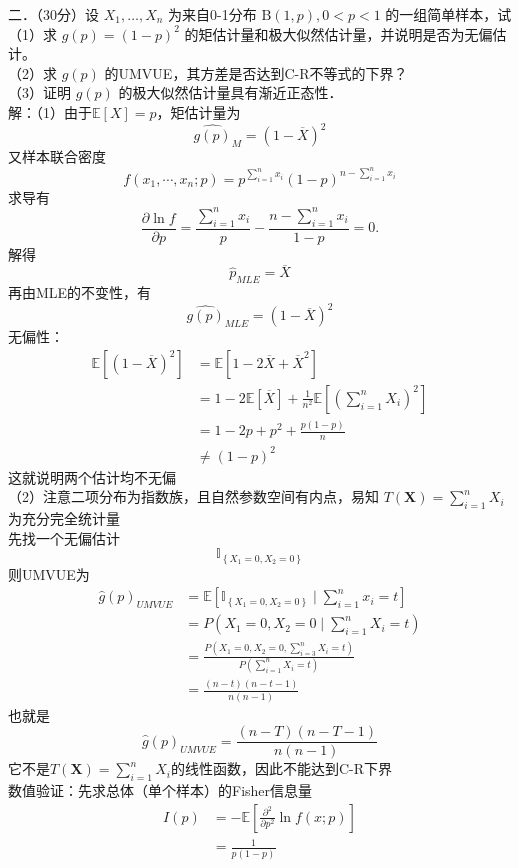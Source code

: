 \documentclass[UTF8]{ctexart}
\begin{document}
\noindent 二．（30分）设 $X_1, \ldots, X_n$ 为来自0-1分布 $\mathrm{B}(1, p), 0<p<1$ 的一组简单样本，试\\
（1）求 $g(p)=(1-p)^2$ 的矩估计量和极大似然估计量，并说明是否为无偏估计。\\
（2）求 $g(p)$ 的UMVUE，其方差是否达到C-R不等式的下界？\\
（3）证明 $g(p)$ 的极大似然估计量具有渐近正态性．\\
解：（1）由于$\mathbb{E}[X]=p$，矩估计量为
\[
\hat{g({p})}_M=(1-\overline{X})^2
\]
又样本联合密度
\[
f\left(x_1, \cdots, x_n ; p\right)=p^{\sum_{i=1}^n x_i}(1-p)^{n-\sum_{i=1}^n x_i}
\]
求导有
\[
\frac{\partial \ln f}{\partial p}=\frac{\sum_{i=1}^{n} x_i}{p}-\frac{n-\sum_{i=1}^n x_i}{1-p}=0 .
\]
解得
\[
\hat{p}_{MLE}=\overline{X}
\]
再由MLE的不变性，有
\[
\hat{g(p)}_{MLE}=\left(1-\overline{X} \right)^2 
\]
无偏性：
\[
\begin{aligned}
	\mathbb{E}\left[(1-\overline{X})^2\right] & =\mathbb{E}\left[1-2 \overline{X}+\overline{X}^2\right] \\
	& =1-2 \mathbb{E}[\overline{X}]+\frac{1}{n^2} \mathbb{E}\left[\left(\sum_{i=1}^n X_i\right)^2 \right] \\
	& =1-2 p+p^2+\frac{p(1-p)}{n} \\
	& \neq(1-p)^2
\end{aligned}
\]
这就说明两个估计均不无偏\\
（2）注意二项分布为指数族，且自然参数空间有内点，易知 $T(\boldsymbol{X})=\sum\limits_{i=1}^n X_i$ 为充分完全统计量\\
先找一个无偏估计
\[
\mathbb{I}_{\left\{X_1=0, X_2=0\right\}}
\]
则UMVUE为
\[
\begin{aligned}
	\hat{g}(p)_{UMVUE} &=\mathbb{E}\left[\mathbb{I}_{\left\{X_1=0, X_2=0\right\}} \mid \sum_{i=1}^n x_i=t\right] \\
	& =P\left(X_1=0, X_2=0 \mid \sum_{i=1}^n X_i=t \right) \\
	& =\frac{P\left(X_1=0, X_2=0, \sum_{i=3}^n X_i=t\right)}{P\left(\sum_{i=1}^n X_i=t\right)}\\
	&=\frac{(n-t)(n-t-1)}{n(n-1) }
\end{aligned}
\]
也就是
\[
\hat{g}(p)_{UMVUE}=\frac{(n-T)(n-T-1)}{n(n-1) }
\]
它不是$T(\boldsymbol{X})=\sum\limits_{i=1}^n X_i$的线性函数，因此不能达到C-R下界\\
数值验证：先求总体（单个样本）的Fisher信息量
\[
\begin{aligned}
	I\left(p\right) & =-\mathbb{E}\left[\frac{\partial^2}{\partial p^2} \ln f\left(x ; p\right)\right] \\
	& =\frac{1}{p(1-p)} 
\end{aligned}
\]
\end{document}
